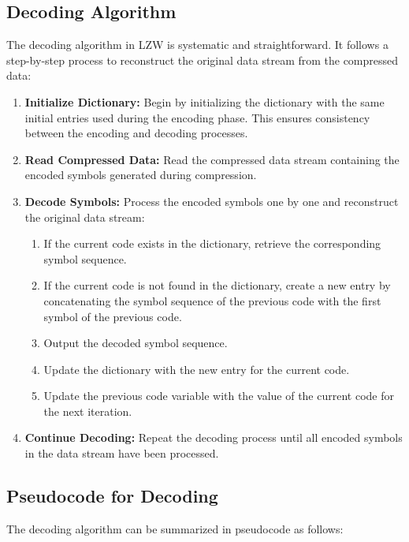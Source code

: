 \documentclass[12pt, a4paper]{article}
\begin{document}
\subsection{Decoding Algorithm}

The decoding algorithm\cite{hoffman1970adaptive} in LZW is systematic and straightforward. It follows a step-by-step process to reconstruct the original data stream from the compressed data:

\begin{enumerate}
    \item \textbf{Initialize Dictionary:} Begin by initializing the dictionary with the same initial entries used during the encoding phase. This ensures consistency between the encoding and decoding processes.
    \item \textbf{Read Compressed Data:} Read the compressed data stream containing the encoded symbols generated during compression.
    \item \textbf{Decode Symbols:} Process the encoded symbols one by one and reconstruct the original data stream:
    \begin{enumerate}
        \item If the current code exists in the dictionary, retrieve the corresponding symbol sequence.
        \item If the current code is not found in the dictionary, create a new entry by concatenating the symbol sequence of the previous code with the first symbol of the previous code.
        \item Output the decoded symbol sequence.
        \item Update the dictionary with the new entry for the current code.
        \item Update the previous code variable with the value of the current code for the next iteration.
    \end{enumerate}
    \item \textbf{Continue Decoding:} Repeat the decoding process until all encoded symbols in the data stream have been processed.
\end{enumerate}
\pagebreak
\subsection{Pseudocode for Decoding}

The decoding algorithm can be summarized in pseudocode as follows:
\end{document}
